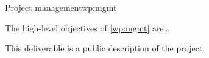 
\begin{workpackage}{Project management}{wp:mgmt}



\makewptable{}

\begin{wpobjectives}
The high-level objectives of \autoref{wp:mgmt} are\dots
\end{wpobjectives}

\begin{wpdescription}



\end{wpdescription}


\begin{wpdeliverables}




This deliverable is a public description of the project.


\end{wpdeliverables}

\end{workpackage}
